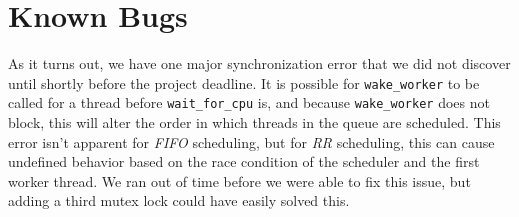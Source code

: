 \documentclass[paper=a4, fontsize=11pt]{scrartcl}
\begin{document}
\section*{Known Bugs}
As it turns out, we have one major synchronization error that we did not discover until shortly before the project deadline. It is possible for \texttt{wake\_worker} to be called for a thread before \texttt{wait\_for\_cpu} is, and because \texttt{wake\_worker} does not block, this will alter the order in which threads in the queue are scheduled. This error isn't apparent for \textit{FIFO} scheduling, but for \textit{RR} scheduling, this can cause undefined behavior based on the race condition of the scheduler and the first worker thread. We ran out of time before we were able to fix this issue, but adding a third mutex lock could have easily solved this.
\end{document}
